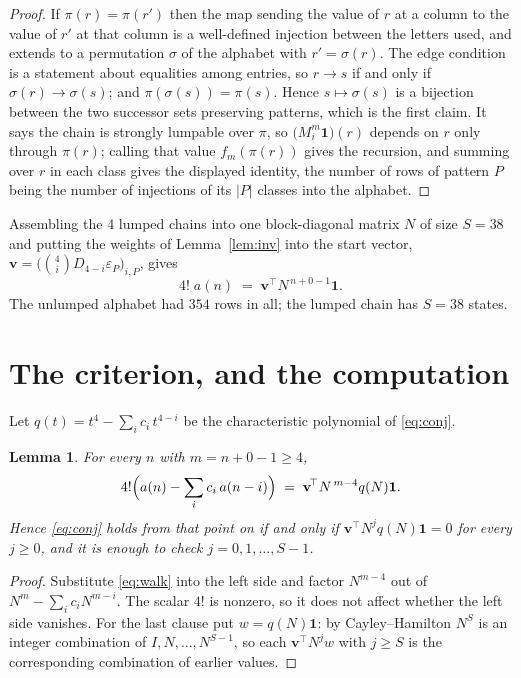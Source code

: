 \documentclass[11pt,a4paper]{article}
\theoremstyle{plain}
\newtheorem{lemma}[theorem]{Lemma}
\theoremstyle{definition}
\begin{document}
\begin{proof}
If $\pi(r)=\pi(r')$ then the map sending the value of $r$ at a column to the value of $r'$
at that column is a well-defined injection between the letters used, and extends to a
permutation $\sigma$ of the alphabet with $r'=\sigma(r)$. The edge condition is a statement
about equalities among entries, so $r\to s$ if and only if $\sigma(r)\to\sigma(s)$; and
$\pi(\sigma(s))=\pi(s)$. Hence $s\mapsto\sigma(s)$ is a bijection between the two successor
sets preserving patterns, which is the first claim. It says the chain is strongly lumpable
over $\pi$, so $\bigl(M_i^{m}\mathbf{1}\bigr)(r)$ depends on $r$ only through $\pi(r)$;
calling that value $f_m(\pi(r))$ gives the recursion, and summing over $r$ in each class
gives the displayed identity, the number of rows of pattern $P$ being the number of
injections of its $|P|$ classes into the alphabet.
\end{proof}

Assembling the $4$ lumped chains into one block-diagonal matrix $N$ of size $S=38$ and
putting the weights of Lemma~\ref{lem:inv} into the start vector,
$\mathbf{v}=\bigl(\binom{4}{i}D_{4-i}\varepsilon_P\bigr)_{i,P}$, gives
\begin{equation}\label{eq:walk}
4!\;a(n)\;=\;\mathbf{v}^{\!\top}N^{\,n+0-1}\mathbf{1} .
\end{equation}
The unlumped alphabet had $354$ rows in all; the lumped chain has $S=38$ states.

\section{The criterion, and the computation}

Let $q(t)=t^{4}-\sum_i c_i\,t^{4-i}$ be the characteristic polynomial of
\eqref{eq:conj}.

\begin{lemma}\label{lem:crit}
For every $n$ with $m=n+0-1\ge4$,
\[
4!\Bigl(a(n)-\sum_i c_i\,a(n-i)\Bigr)\;=\;\mathbf{v}^{\!\top}N^{\,m-4}q(N)\mathbf{1} .
\]
Hence \eqref{eq:conj} holds from that point on if and only if
$\mathbf{v}^{\!\top}N^{j}q(N)\mathbf{1}=0$ for every $j\ge0$, and it is enough to check
$j=0,1,\dots,S-1$.
\end{lemma}

\begin{proof}
Substitute \eqref{eq:walk} into the left side and factor $N^{m-4}$ out of
$N^{m}-\sum_i c_iN^{m-i}$. The scalar $4!$ is nonzero, so it does not affect whether
the left side vanishes. For the last clause put $w=q(N)\mathbf{1}$: by Cayley--Hamilton
$N^{S}$ is an integer combination of $I,N,\dots,N^{S-1}$, so each
$\mathbf{v}^{\!\top}N^{j}w$ with $j\ge S$ is the corresponding combination of earlier
values.
\end{proof}
\end{document}
